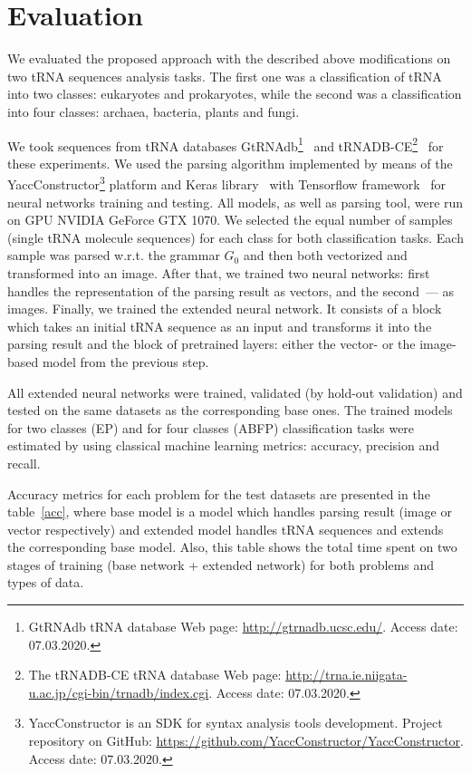 \section{Evaluation}
We evaluated the proposed approach with the described above modifications on two tRNA sequences analysis tasks.
The first one was a classification of tRNA into two classes: eukaryotes and prokaryotes, while the second was a classification into four classes: archaea, bacteria, plants and fungi.


We took sequences from tRNA databases GtRNAdb\footnote{GtRNAdb tRNA database Web page: \url{http://gtrnadb.ucsc.edu/}. Access date: 07.03.2020.}~\cite{chan2016gtrnadb} and tRNADB-CE\footnote{The tRNADB-CE tRNA database Web page: \url{http://trna.ie.niigata-u.ac.jp/cgi-bin/trnadb/index.cgi}. Access date: 07.03.2020.}~\cite{abe2014trnadb} for these experiments.
We used the parsing algorithm implemented by means of the YaccConstructor\footnote{YaccConstructor is an SDK for syntax analysis tools development. Project repository on GitHub: \url{https://github.com/YaccConstructor/YaccConstructor}. Access date: 07.03.2020.} platform and Keras library~\cite{chollet2015keras} with Tensorflow framework~\cite{tensorflow2015-whitepaper} for neural networks training and testing.
All models, as well as parsing tool, were run on GPU NVIDIA GeForce GTX 1070.
We selected the equal number of samples (single tRNA molecule sequences) for each class for both classification tasks.
Each sample was parsed w.r.t. the grammar $G_0$ and then both vectorized and transformed into an image.
After that, we trained two neural networks: first handles the representation of the parsing result as vectors, and the second~--- as images.
Finally, we trained the extended neural network.
It consists of a block which takes an initial tRNA sequence as an input and transforms it into the parsing result and the block of pretrained layers: either the vector- or the image-based model from the previous step. 

All extended neural networks were trained, validated (by hold-out validation) and tested on the same datasets as the corresponding base ones.
The trained models for two classes (EP) and for four classes (ABFP) classification tasks were estimated by using classical machine learning metrics: accuracy, precision and recall.

Accuracy metrics for each problem for the test datasets are presented in the table~\ref{acc}, where base model is a model which handles parsing result (image or vector respectively) and extended model handles tRNA sequences and extends the corresponding base model. Also, this table shows the total time spent on two stages of training (base network + extended network) for both problems and types of data.

